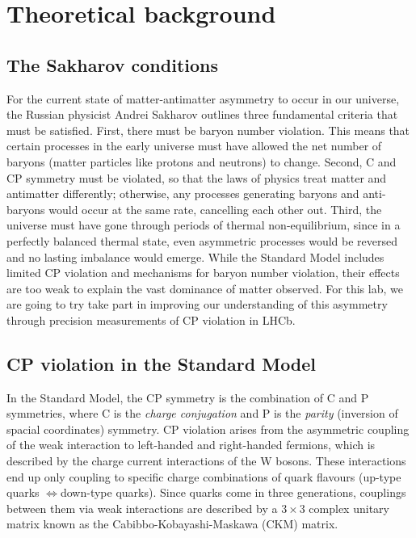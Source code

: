 \chapter{Theoretical background}\label{chap:01}

\section{The Sakharov conditions}

For the current state of matter-antimatter asymmetry to occur in our universe, the Russian physicist Andrei Sakharov outlines three fundamental criteria that must be satisfied\cite{Sakharov}. First, there must be baryon number violation. This means that certain processes in the early universe must have allowed the net number of baryons (matter particles like protons and neutrons) to change. Second, C and CP symmetry must be violated, so that the laws of physics treat matter and antimatter differently; otherwise, any processes generating baryons and anti-baryons would occur at the same rate, cancelling each other out. Third, the universe must have gone through periods of thermal non-equilibrium, since in a perfectly balanced thermal state, even asymmetric processes would be reversed and no lasting imbalance would emerge. While the Standard Model includes limited CP violation and mechanisms for baryon number violation, their effects are too weak to explain the vast dominance of matter observed. For this lab, we are going to try take part in improving our understanding of this asymmetry through precision measurements of CP violation in LHCb.

\section{CP violation in the Standard Model}

In the Standard Model, the CP symmetry is the combination of C and P symmetries, where C is the \textit{charge conjugation} and P is the \textit{parity} (inversion of spacial coordinates) symmetry.
CP violation arises from the asymmetric coupling of the weak interaction to left-handed and right-handed fermions, which is described by the charge current interactions of the W bosons.
These interactions end up only coupling to specific charge combinations of quark flavours (up-type quarks $\Leftrightarrow{}$down-type quarks). Since quarks come in three generations, couplings between them via weak interactions are described by a $3\times3$ complex unitary matrix known as the Cabibbo-Kobayashi-Maskawa (CKM) matrix\cite{CKM}.

